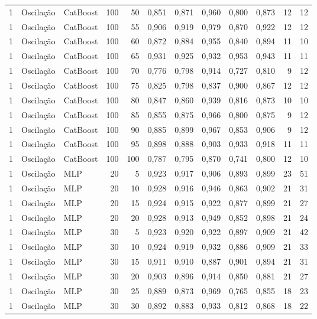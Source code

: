 \begin{longtable}{@{}rllrrrrrrrrr@{}}
1 & Oscilação & CatBoost & 100 & 50 & 0,851 & 0,871 & 0,960 & 0,800 & 0,873 & 12 & 12 \\
1 & Oscilação & CatBoost & 100 & 55 & 0,906 & 0,919 & 0,979 & 0,870 & 0,922 & 12 & 12 \\
1 & Oscilação & CatBoost & 100 & 60 & 0,872 & 0,884 & 0,955 & 0,840 & 0,894 & 11 & 10 \\
1 & Oscilação & CatBoost & 100 & 65 & 0,931 & 0,925 & 0,932 & 0,953 & 0,943 & 11 & 11 \\
1 & Oscilação & CatBoost & 100 & 70 & 0,776 & 0,798 & 0,914 & 0,727 & 0,810 & 9 & 12 \\
1 & Oscilação & CatBoost & 100 & 75 & 0,825 & 0,798 & 0,837 & 0,900 & 0,867 & 12 & 12 \\
1 & Oscilação & CatBoost & 100 & 80 & 0,847 & 0,860 & 0,939 & 0,816 & 0,873 & 10 & 10 \\
1 & Oscilação & CatBoost & 100 & 85 & 0,855 & 0,875 & 0,966 & 0,800 & 0,875 & 9 & 12 \\
1 & Oscilação & CatBoost & 100 & 90 & 0,885 & 0,899 & 0,967 & 0,853 & 0,906 & 9 & 12 \\
1 & Oscilação & CatBoost & 100 & 95 & 0,898 & 0,888 & 0,903 & 0,933 & 0,918 & 11 & 11 \\
1 & Oscilação & CatBoost & 100 & 100 & 0,787 & 0,795 & 0,870 & 0,741 & 0,800 & 12 & 10 \\
1 & Oscilação & MLP & 20 & 5 & 0,923 & 0,917 & 0,906 & 0,893 & 0,899 & 23 & 51 \\
1 & Oscilação & MLP & 20 & 10 & 0,928 & 0,916 & 0,946 & 0,863 & 0,902 & 21 & 31 \\
1 & Oscilação & MLP & 20 & 15 & 0,924 & 0,915 & 0,922 & 0,877 & 0,899 & 21 & 27 \\
1 & Oscilação & MLP & 20 & 20 & 0,928 & 0,913 & 0,949 & 0,852 & 0,898 & 21 & 24 \\
1 & Oscilação & MLP & 30 & 5 & 0,923 & 0,920 & 0,922 & 0,897 & 0,909 & 21 & 42 \\
1 & Oscilação & MLP & 30 & 10 & 0,924 & 0,919 & 0,932 & 0,886 & 0,909 & 21 & 33 \\
1 & Oscilação & MLP & 30 & 15 & 0,911 & 0,910 & 0,887 & 0,901 & 0,894 & 21 & 31 \\
1 & Oscilação & MLP & 30 & 20 & 0,903 & 0,896 & 0,914 & 0,850 & 0,881 & 21 & 27 \\
1 & Oscilação & MLP & 30 & 25 & 0,889 & 0,873 & 0,969 & 0,765 & 0,855 & 18 & 23 \\
1 & Oscilação & MLP & 30 & 30 & 0,892 & 0,883 & 0,933 & 0,812 & 0,868 & 18 & 22 \\

\end{longtable}
